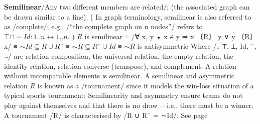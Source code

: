 \documentclass[11pt]{article}
\begin{document}
\vspace{1em}\textbf{Semilinear}\quad\label{org-special-block-extras-glossary-Semilinear}/Any two different members are related/; (the associated graph can be drawn similar to a line).  ( In graph terminology, semilinear is also referred to as /complete/; e.g., /“the complete graph on n nodes”/ refers to $⊤ ∩ ∼Id : 1..n ↔ 1..n$. )   \quad  $R$ is semilinear ≡ \quad /∀ x, y • x ≠ y \quad ⇒ \quad x 〔R〕 y \quad ∨ \quad y 〔R〕 x/ ≡ \quad $∼Id ⊆ R ∪ R ˘$ ≡ \quad $∼ R ⊆ R ˘ ∪ Id$ ≡ \quad $∼ R$ is antisymmetric  Where /⨾, ⊤, ⊥, Id, ˘, ∼/ are relation composition, the universal relation, the empty relation, the identity relation, relation converse (transpose), and complement.  A relation without incomparable elements is semilinear.  A semilinear and asymmetric relation $R$ is known as a /tournament/ since it models the win-loss situation of a typical sports tournament: Semilinearity and asymmetry ensure teams do not play against themselves and that there is no draw ---i.e., there must be a winner. A tournament /R/ is characterised by /R ∪ R˘ = ∼Id/. See page \pageref{org-special-block-extras-glossary-declaration-site-Semilinear}
\end{document}
